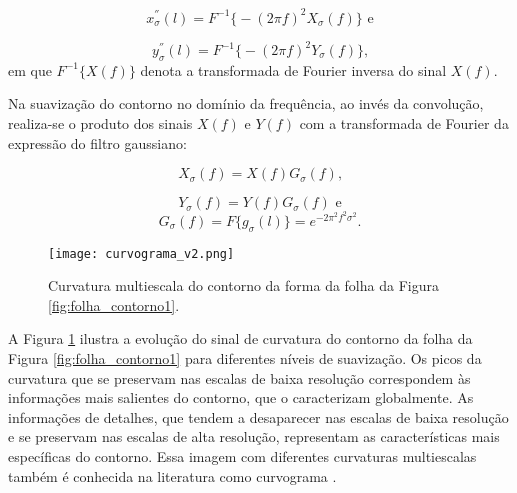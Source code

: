 \begin{equation}
x_{\sigma}^{''}(l) = F^{-1}\big\{- (2 \pi f)^2 X_{\sigma}(f)\big\}\text{ e}
\end{equation}

\begin{equation}
y_{\sigma}^{''}(l) = F^{-1}\big\{- (2 \pi f)^2 Y_{\sigma}(f)\big\}\text{,}
\end{equation} 
\noindent em que $F^{-1}\big\{X(f)\big\}$ denota a transformada de Fourier inversa do sinal $X(f)$.

\begin{comment}
\begin{equation}
X(f) = F\big\{x(l)\big\} = \int\limits^\infty_\infty x(l)e^{-2 \pi j f l}dl
\end{equation}

\begin{equation}
x(l) = F^{-1}\big\{X(f)\big\} \int\limits^\infty_\infty X(f)e^{2 \pi j f l}df
\end{equation}
\end{comment}

Na suavização do contorno no domínio da frequência, ao invés da convolução, realiza-se o produto dos sinais $X(f)$ e $Y(f)$ com a transformada de Fourier da expressão do filtro gaussiano:

\begin{equation}
X_\sigma(f) = X(f)G_\sigma(f) \text{,}
\end{equation}

\begin{equation}
Y_\sigma(f) = Y(f)G_\sigma(f)\text{ e}
\end{equation} 
\begin{equation}
G_\sigma(f) = F\big\{ g_{\sigma}(l)\big\} = e^{-2 \pi^2 f^2 \sigma^2}\text{.}
\end{equation}

\begin{figure}[h!]
  \caption{\label{fig:curv_ms} Curvatura multiescala do contorno da forma da folha da Figura \ref{fig:folha_contorno1}.}
  \centering
  \texttt{[image: curvograma\_v2.png]}
 \end{figure}

A Figura \ref{fig:curv_ms} ilustra a evolução do sinal de curvatura do contorno da folha da Figura \ref{fig:folha_contorno1} para diferentes níveis de suavização. Os picos da curvatura que se preservam nas escalas de baixa resolução correspondem às informações mais salientes do contorno, que o caracterizam globalmente. As informações de detalhes, que tendem a desaparecer nas escalas de baixa resolução e se preservam nas escalas de alta resolução, representam as características mais específicas do contorno. Essa imagem com diferentes curvaturas multiescalas também é conhecida na literatura como curvograma \cite{Cesar:1996}.


